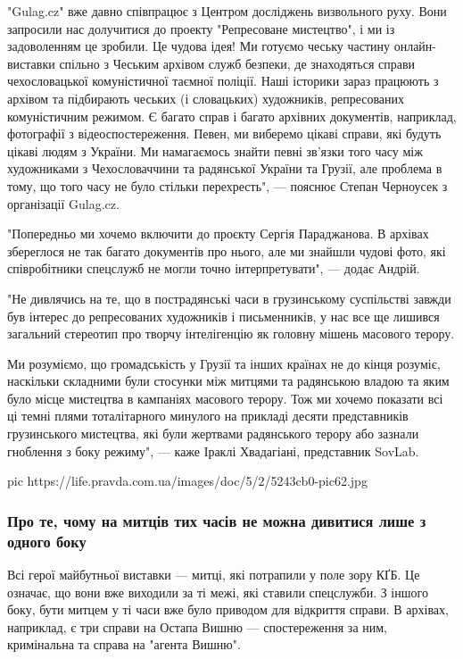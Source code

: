 "Gulag.cz" вже давно співпрацює з Центром досліджень визвольного руху. Вони
запросили нас долучитися до проекту "Репресоване мистецтво", і ми із
задоволенням це зробили. Це чудова ідея! Ми готуємо чеську частину
онлайн-виставки спільно з Чеським архівом служб безпеки, де знаходяться справи
чехословацької комуністичної таємної поліції. Наші історики зараз працюють з
архівом та підбирають чеських (і словацьких) художників, репресованих
комуністичним режимом. Є багато справ і багато архівних документів, наприклад,
фотографії з відеоспостереження. Певен, ми виберемо цікаві справи, які будуть
цікаві людям з України. Ми намагаємось знайти певні зв’язки того часу між
художниками з Чехословаччини та радянської України та Грузії, але проблема в
тому, що того часу не було стільки перехресть", --- пояснює Степан Черноусек з
організації Gulag.cz.

"Попередньо ми хочемо включити до проєкту Сергія Параджанова. В архівах
збереглося не так багато документів про нього, але ми знайшли чудові фото, які
співробітники спецслужб не могли точно інтерпретувати", --- додає Андрій.

"Не дивлячись на те, що в пострадянські часи в грузинському суспільстві завжди
був інтерес до репресованих художників і письменників, у нас все ще лишився
загальний стереотип про творчу інтелігенцію як головну мішень масового терору. 

Ми розуміємо, що громадськість у Грузії та інших країнах не до кінця розуміє,
наскільки складними були стосунки між митцями та радянською владою та яким було
місце мистецтва в кампаніях масового терору. Тож ми хочемо показати всі ці
темні плями тоталітарного минулого на прикладі десяти представників
грузинського мистецтва, які були жертвами радянського терору або зазнали
гноблення з боку режиму", --- каже Іраклі Хвадагіані, представник SovLab.

\ifcmt
pic https://life.pravda.com.ua/images/doc/5/2/5243cb0-pic62.jpg
\fi

\subsubsection{Про те, чому на митців тих часів не можна дивитися лише з одного боку}

Всі герої майбутньої виставки --- митці, які потрапили у поле зору КҐБ. Це
означає, що вони вже виходили за ті межі, які ставили спецслужби. З іншого
боку, бути митцем у ті часи вже було приводом для відкриття справи. В архівах,
наприклад, є три справи на Остапа Вишню --- спостереження за ним, кримінальна та
справа на "агента Вишню". 

